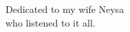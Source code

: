 \newpage
\begin{center}
    \vspace*{0.5\textheight} %
    Dedicated to my wife Neysa\\
    who listened to it all.
\end{center}
\newpage
